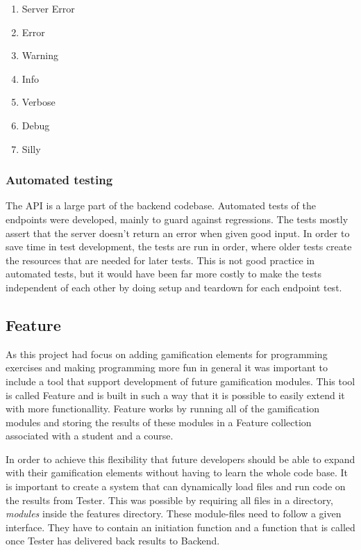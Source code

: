 \begin{enumerate}
  \item Server Error
  \item Error
  \item Warning
  \item Info
  \item Verbose
  \item Debug
  \item Silly
\end{enumerate}

\subsubsection{Automated testing}
The API is a large part of the backend codebase. Automated tests of the endpoints were developed, mainly to guard against regressions. The tests mostly assert that the server doesn't return an error when given good input. In order to save time in test development, the tests are run in order, where older tests create the resources that are needed for later tests. This is not good practice in automated tests, but it would have been far more costly to make the tests independent of each other by doing setup and teardown for each endpoint test.

\subsection{Feature}

As this project had focus on adding gamification elements for programming exercises
and making programming more fun in general it was important to include
a tool that support development of future gamification modules. This tool is called
Feature and is built in such a way that it is possible to easily extend it with more
functionallity. Feature works by running all of the gamification modules and
storing the results of these modules in a Feature collection associated with
a student and a course.

In order to achieve this flexibility that future developers should be able to expand
with their gamification elements without having to learn the whole code base.
It is important to create a system that can dynamically load files and run
code on the results from Tester. This was possible by requiring all
files in a directory, \textit{modules} inside the features directory. These module-files need to follow
a given interface. They have to contain an initiation function and a function
that is called once Tester has delivered back results to Backend. 

